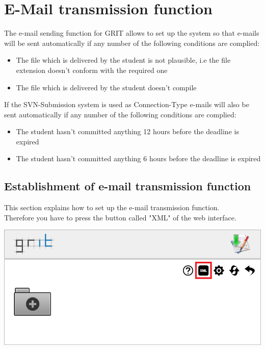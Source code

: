 \documentclass[10pt,a4paper, titlepage, toc=idx]{scrreprt}
\theoremstyle{definition}
\theoremstyle{plain}
\begin{document}
		\section{E-Mail transmission function}
The e-mail sending function for GRIT allows to set up the system so that e-mails will be sent automatically if any number of the following conditions are complied:
\begin{itemize}
\item The file which is delivered by the student is not plausible, i.e the file extension doesn't conform with the required one

\item The file which is delivered by the student doesn't compile
\end{itemize}

If the SVN-Submission system is used as Connection-Type e-mails will also be sent automatically if any number of the following conditions are complied:
\begin{itemize}
\item The student hasn't committed anything 12 hours before the deadline is expired

\item The student hasn't committed anything 6 hours before the deadline is expired
\end{itemize}

\subsection*{Establishment of e-mail transmission function}
This section explains how to set up the e-mail transmission function.\\
Therefore you have to press the button called "XML" of the web interface.
\begin{center}
\includegraphics[scale=0.55]{pictures/home_xml-marked.png} 
\end{center}
\end{document}
